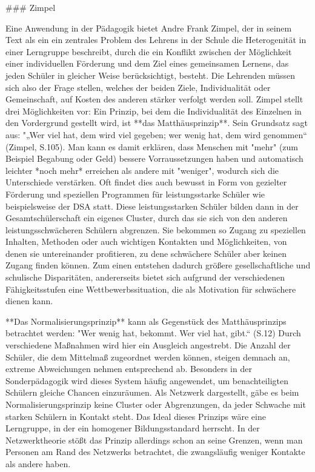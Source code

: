 ### Zimpel

Eine Anwendung in der Pädagogik bietet Andre Frank Zimpel, der in seinem Text als ein ein zentrales Problem des Lehrens in der Schule die Heterogenität in einer Lerngruppe beschreibt, durch die ein Konflikt zwischen der Möglichkeit einer individuellen Förderung und dem Ziel eines gemeinsamen Lernens, das jeden Schüler in gleicher Weise berücksichtigt, besteht.
Die Lehrenden müssen sich also der Frage stellen, welches der beiden Ziele, Individualität oder Gemeinschaft, auf Kosten des anderen stärker verfolgt werden soll.
Zimpel stellt drei Möglichkeiten vor:
Ein Prinzip, bei dem die Individualität des Einzelnen in den Vordergrund gestellt wird, ist **das Matthäusprinzip**.
Sein Grundsatz sagt aus: "„Wer viel hat, dem wird viel gegeben; wer wenig hat, dem wird genommen“ (Zimpel, S.105).
Man kann es damit erklären, dass Menschen mit "mehr" (zum Beispiel Begabung oder Geld) bessere Vorraussetzungen haben und automatisch leichter *noch mehr* erreichen als andere mit "weniger", wodurch sich die Unterschiede verstärken.
Oft findet dies auch bewusst in Form von gezielter Förderung und speziellen Programmen für leistungsstarke Schüler wie beispielsweise der DSA statt.
Diese leistungsstarken Schüler bilden dann in der Gesamtschülerschaft ein eigenes Cluster, durch das sie sich von den anderen leistungsschwächeren Schülern abgrenzen. Sie bekommen so Zugang zu speziellen Inhalten, Methoden oder auch wichtigen Kontakten und Möglichkeiten, von denen sie untereinander profitieren, zu dene schwächere Schüler aber keinen Zugang finden können.
Zum einen entstehen dadurch größere gesellschaftliche und schulische Disparitäten, andererseits bietet sich aufgrund der verschiedenen Fähigkeitsstufen eine Wettbewerbssituation, die als Motivation für schwächere dienen kann.

**Das Normalisierungsprinzip** kann als Gegenstück des Matthäusprinzips betrachtet werden: "Wer wenig hat, bekommt. Wer viel hat, gibt.“ (S.12)
Durch verschiedene Maßnahmen wird hier ein Ausgleich angestrebt.
Die Anzahl der Schüler, die dem Mittelmaß zugeordnet werden können, steigen demnach an, extreme Abweichungen nehmen entsprechend ab.
Besonders in der Sonderpädagogik wird dieses System häufig angewendet, um benachteiligten Schülern gleiche Chancen einzuräumen.
Als Netzwerk dargestellt, gäbe es beim Normalisierungsprinzip keine Cluster oder Abgrenzungen, da jeder Schwache mit starken Schülern in Kontakt steht.
Das Ideal dieses Prinzips wäre eine Lerngruppe, in der ein homogener Bildungsstandard herrscht.
In der Netzwerktheorie stößt das Prinzip allerdings schon an seine Grenzen, wenn man Personen am Rand des Netzwerks betrachtet, die zwangsläufig weniger Kontakte als andere haben.

